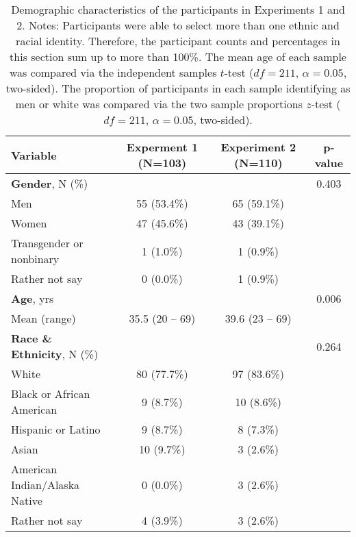 \documentclass[a4paper,12pt]{article}
\begin{document}
\begin{refsection}[supp]
\begin{table}[h]
    \centering
    \begin{tabular*}{\textwidth}{lccc}
    \toprule
    Variable & \small Experment 1 (N=103) & \small Experiment 2 (N=110)  & p-value \\
    \midrule
    \textbf{Gender}, N (\%)                & & & 0.403 \\
    \hspace{1em} Men                       & 55 (53.4\%) & 65 (59.1\%) & \\
    \hspace{1em} Women                     & 47 (45.6\%) & 43 (39.1\%) & \\
    \hspace{1em} Transgender or nonbinary         &   1  (1.0\%) &   1  (0.9\%) & \\
    \hspace{1em} Rather not say            &   0  (0.0\%) &   1  (0.9\%) & \\
    \midrule
    \textbf{Age}, yrs                      & & & 0.006 \\
    \hspace{1em} Mean (range)              & 35.5 (20 -- 69) & 39.6 (23 -- 69) & \\
    \midrule
    \textbf{Race \& Ethnicity}, N (\%)                  & & & 0.264 \\
    \hspace{1em} White                     & 80 (77.7\%) &  97 (83.6\%) & \\ 
    \hspace{1em} Black or African American &  9  (8.7\%) &  10  (8.6\%) & \\
    \hspace{1em} Hispanic or Latino        &  9  (8.7\%) &  8  (7.3\%) & \\
    \hspace{1em} Asian                     & 10  (9.7\%) &   3  (2.6\%) & \\
    \hspace{1em} American Indian/Alaska Native & 0 (0.0\%) & 3 (2.6\%) & \\
    \hspace{1em} Rather not say            &  4  (3.9\%) &  3  (2.6\%) & \\
    \bottomrule
    \end{tabular*}
    \caption{Demographic characteristics of the participants in Experiments 1 and 2. Notes: Participants were able to select more than one ethnic and racial identity. Therefore, the participant counts and percentages in this section sum up to more than 100\%. The mean age of each sample was compared via the independent samples $t$-test ($df = 211$, $\alpha = 0.05$, two-sided). The proportion of participants in each sample identifying as men or white was compared via the two sample proportions $z$-test ($df = 211$, $\alpha = 0.05$, two-sided).}
    \label{tab:demographics}
\end{table}


\end{refsection}
\end{document}
